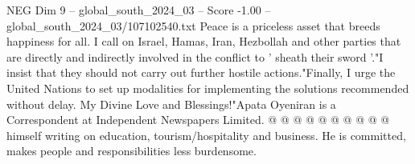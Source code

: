 \begin{textsample}{NEG Dim 9 – global\_south\_2024\_03 – Score -1.00 – global\_south\_2024\_03/107102540.txt}
Peace is a priceless asset that breeds happiness for all.
I call on Israel, Hamas, Iran, Hezbollah and other parties that are directly and indirectly involved in the conflict to ' sheath their sword '."I insist that they should not carry out further hostile actions."Finally, I urge the United Nations to set up modalities for implementing the solutions recommended without delay.
My Divine Love and Blessings!"Apata Oyeniran is a Correspondent at Independent Newspapers Limited. @ @ @ @ @ @ @ @ @ @ himself writing on education, tourism/hospitality and business.
He is committed, makes people and responsibilities less burdensome.

\end{textsample}
